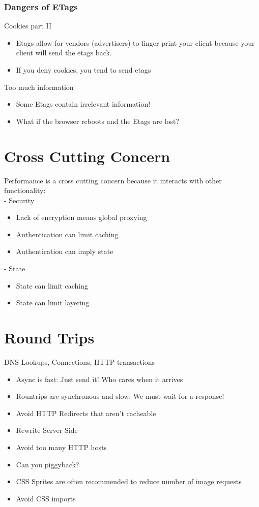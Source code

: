 \documentclass[../CMPUT-404-Notes.tex]{subfiles}
\begin{document}
\subsubsection{Dangers of ETags}
Cookies part II
\begin{itemize}
    \item Etags allow for vendors (advertisers) to finger print your
    client because your client will send the etags back.
    \item If you deny cookies, you tend to send etags
\end{itemize}

Too much information
\begin{itemize}
    \item Some Etags contain irrelevant information!
    \item What if the browser reboots and the Etags are
    lost?
\end{itemize}

\section{Cross Cutting Concern}
Performance is a cross cutting concern
because it interacts with other functionality:\\
\noindent
- Security
\begin{itemize}
    \item Lack of encryption means global proxying
    \item Authentication can limit caching
    \item Authentication can imply state
\end{itemize}
- State
\begin{itemize}
    \item State can limit caching
    \item State can limit layering
\end{itemize}

\section{Round Trips}
DNS Lookups, Connections, HTTP transactions
\begin{itemize}
    \item Async is fast: Just send it! Who cares when it arrives
    \item Rountrips are synchronous and slow: We must wait for a
    response!
    \item Avoid HTTP Redirects that aren't cacheable
    \item Rewrite Server Side
    \item Avoid too many HTTP hosts
    \item Can you piggyback?
    \item CSS Sprites are often recommended to reduce number of image requests
    \item Avoid CSS imports
\end{itemize}
\end{document}
